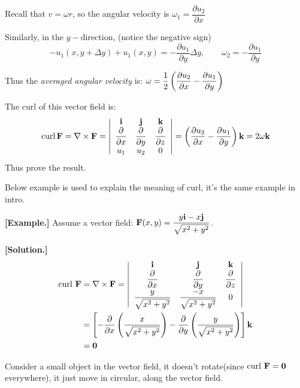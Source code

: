 \documentclass[11pt, a4paper]{MATH2023}
\newcommand{\eg}{\textbf{[Example.] }}
\newcommand{\sol}{\textbf{[Solution.] }}
\newcommand{\ii}{{\bf i}}
\newcommand{\jj}{{\bf j}}
\newcommand{\kk}{{\bf k}}
\newcommand{\FF}{{\bf F}}
\newcommand{\curl}{{\rm curl\ }}
\newcommand{\pt}{\partial}
\begin{document}
\begin{spacing}{1.3}
\begin{center}
    \end{center}
    Recall that $v=\omega r$, so the angular velocity is $\omega_1 = \dfrac{\pt u_2}{\pt x}$

    Similarly, in the $y-$direction, (notice the negative sign)
    $$-u_1(x,y+\Delta y)+u_1(x,y)=-\dfrac{\pt u_1}{\pt y}\Delta y,\qquad 
    \omega_2 = -\dfrac{\pt u_1}{\pt y}$$

    Thus the {\it averaged angular velocity} is: $\disp \omega = \frac{1}{2} 
    \left(\frac{\pt u_2}{\pt x} - \frac{\pt u_1}{\pt y}\right)$

    The curl of this vector field is: 
    $$
    \operatorname{curl} \mathbf{F}=\nabla \times \mathbf{F}=\left|\begin{array}{ccc}
    \mathbf{i} & \mathbf{j} & \mathbf{k} \\
    \dfrac{\partial}{\partial x} & \dfrac{\partial}{\partial y} & \dfrac{\partial}{\partial z} \\
    u_1 & u_2 & 0
    \end{array}\right|= \left(\frac{\pt u_2}{\pt x} - \frac{\pt u_1}{\pt y}\right)\kk =2\omega \kk
    $$
    Thus prove the result.


    \vspace{0.5in}
    {\blue Below example is used to explain the meaning of curl, it's the same example in intro.}

    \eg Assume a vector field: ${\bf F}(x,y)=\dfrac{y\ii -x\jj}{\sqrt{x^2+y^2}}$.

    \sol
    \begin{align*}
        {\curl \FF} &= \nabla \times \FF = \left|\begin{array}{ccc}
            \ii & \jj & \kk \\ \dfrac{\partial}{\partial x} & \dfrac{\partial}{\partial y} & \dfrac{\partial}{\partial z} \\
            \dfrac{y}{\sqrt{x^2+y^2}} & \dfrac{-x}{\sqrt{x^2+y^2}} & 0
        \end{array} \right|\\
        &= \left[ -\dfrac{\pt}{\pt x}\left( \dfrac{x}{\sqrt{x^2+y^2}} \right)
                -\dfrac{\pt}{\pt y}\left( \dfrac{y}{\sqrt{x^2+y^2}}\right) \right] \kk \\
        &= {\bf 0}   
    \end{align*}

    Consider a small object in the vector field, it doesn't rotate(since $\curl \FF={\bf 0}$ everywhere),
    it just move in circular, along the vector field.


\end{spacing}
\end{document}
